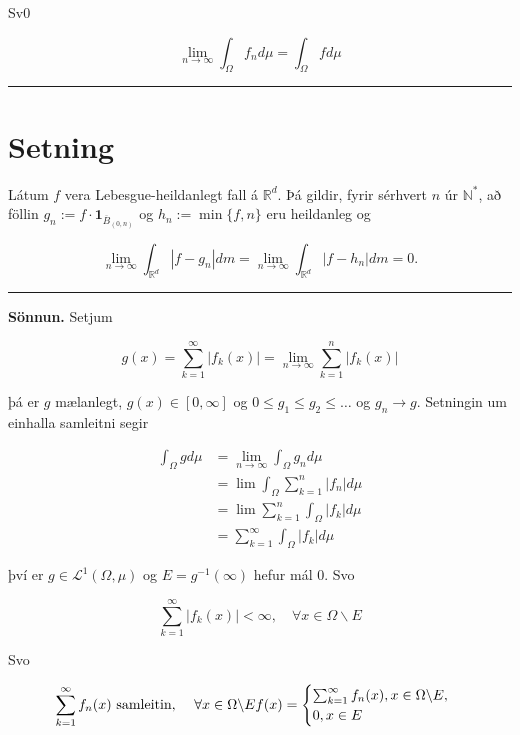 \documentclass[]{book}
\begin{document}
Sv0

\[
\lim_{n\rightarrow\infty}\int_\Omega f_nd\mu = \int_\Omega fd\mu
\]

\begin{center}\rule{0.5\linewidth}{\linethickness}\end{center}

\hypertarget{setning-53}{%
\section{Setning}\label{setning-53}}

Látum \(f\) vera Lebesgue-heildanlegt fall á \(\mathbb R^d\). Þá gildir, fyrir sérhvert \(n\) úr \(\mathbb N^*\), að föllin \(g_n:=f\cdot\mathbf1_{\overline B_{(0,n)}}\) og \(h_n := \min\{f,n\}\) eru heildanleg og

\[
\lim_{n\rightarrow\infty}\int_{\mathbb R^d}|f-g_n|dm = \lim_{n\rightarrow\infty}\int_{\mathbb R^d}|f-h_n|dm = 0.
\]

\begin{center}\rule{0.5\linewidth}{\linethickness}\end{center}

\textbf{Sönnun.} Setjum

\[
g(x) = \sum_{k=1}^\infty |f_k(x)| = \lim_{n\rightarrow\infty}\sum_{k=1}^n|f_k(x)|
\]

þá er \(g\) mælanlegt, \(g(x) \in [0,\infty]\) og \(0\leq g_1\leq g_2 \leq \dots\) og \(g_n\rightarrow g\). Setningin um einhalla samleitni segir

\[
\begin{aligned}
\int_\Omega gd\mu &= \lim_{n\rightarrow\infty} \int_\Omega g_nd\mu \\
&= \lim\int_\Omega\sum_{k=1}^n|f_n|d\mu \\
&= \lim\sum_{k=1}^n\int_\Omega|f_k|d\mu \\
&= \sum_{k=1}^\infty\int_\Omega|f_k|d\mu
\end{aligned}
\]

því er \(g\in\mathcal L^1(\Omega,\mu)\) og \(E=g^{-1}(\infty)\) hefur mál 0. Svo

\[
\sum_{k=1}^\infty|f_k(x)| < \infty, \quad \forall x\in\Omega\backslash E
\]

Svo

\[
\sum_{k=1}^\infty f_n(x) \text{ samleitin, } \quad \forall x\in\Omega\backslash E \\
f(x) = 
\begin{cases}
\sum_{k=1}^\infty f_n(x), x\in\Omega\backslash E,\\
0, x\in E
\end{cases}
\]
\end{document}
